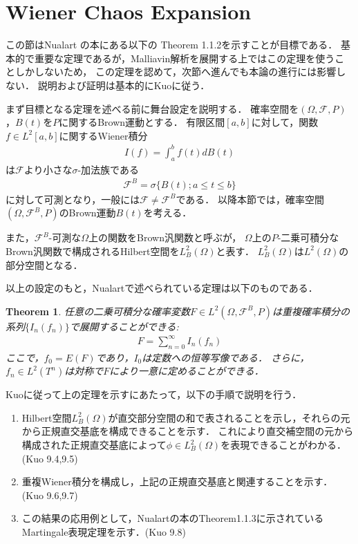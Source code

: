 \documentclass[a4paper,10pt]{jsarticle}
\theoremstyle{plain}
\newtheorem{theorem}{Theorem}
\newcommand{\eq}[1]{\begin{align}#1\end{align}}
\newcommand{\enums}[1]{\begin{enumerate}#1\end{enumerate}}
\begin{document}
\section{Wiener Chaos Expansion}
この節はNualart\cite{Nualart2006} の本にある以下の Theorem 1.1.2を示すことが目標である．
基本的で重要な定理であるが，Malliavin解析を展開する上ではこの定理を使うことしかしないため，
この定理を認めて，次節へ進んでも本論の進行には影響しない．
説明および証明は基本的にKuo\cite{Kuo2006}に従う．

まず目標となる定理を述べる前に舞台設定を説明する．
確率空間を$(\Omega, \mathcal{F}, P)$，$B(t)$を$P$に関するBrown運動とする．
有限区間$[a, b]$に対して，関数$f\in L^2[a, b]$に関するWiener積分
\eq{I(f)=\int_a^bf(t)dB(t)}
は$\mathcal{F}$より小さな$\sigma$-加法族である
\eq{\mathcal{F}^B=\sigma\{B(t);a\le t\le b\}}
に対して可測となり，一般には$\mathcal{F}\neq\mathcal{F}^B$である．
以降本節では，確率空間$(\Omega, \mathcal{F}^B, P)$のBrown運動$B(t)$を考える．

また，$\mathcal{F}^B$-可測な$\Omega$上の関数をBrown汎関数と呼ぶが，
$\Omega$上の$P$-二乗可積分なBrown汎関数で構成されるHilbert空間を$L^2_B(\Omega)$と表す．
$L^2_B(\Omega)$は$L^2(\Omega)$の部分空間となる．

以上の設定のもと，Nualart\cite{Nualart2006}で述べられている定理は以下のものである．
\begin{theorem}
任意の二乗可積分な確率変数$F\in L^2(\Omega, \mathcal{F}^B, P)$は重複確率積分の系列$\{I_n(f_n)\}$で展開することができる:
\eq{F=\sum_{n=0}^\infty I_n(f_n)}
ここで，$f_0=E(F)$であり，$I_0$は定数への恒等写像である．
さらに，$f_n\in L^2(T^n)$は対称で$F$により一意に定めることができる．
\end{theorem}

Kuo\cite{Kuo2006}に従って上の定理を示すにあたって，以下の手順で説明を行う．
\enums{
	\item Hilbert空間$L^2_B(\Omega)$が直交部分空間の和で表されることを示し，それらの元から正規直交基底を構成できることを示す．
	これにより直交補空間の元から構成された正規直交基底によって$\phi\in L^2_B(\Omega)$を表現できることがわかる．(Kuo\cite{Kuo2006} 9.4,9.5)
	\item 重複Wiener積分を構成し，上記の正規直交基底と関連することを示す．(Kuo\cite{Kuo2006} 9.6,9.7)
	\item この結果の応用例として，Nualartの本のTheorem1.1.3に示されているMartingale表現定理を示す．(Kuo\cite{Kuo2006} 9.8)
}

\end{document}
